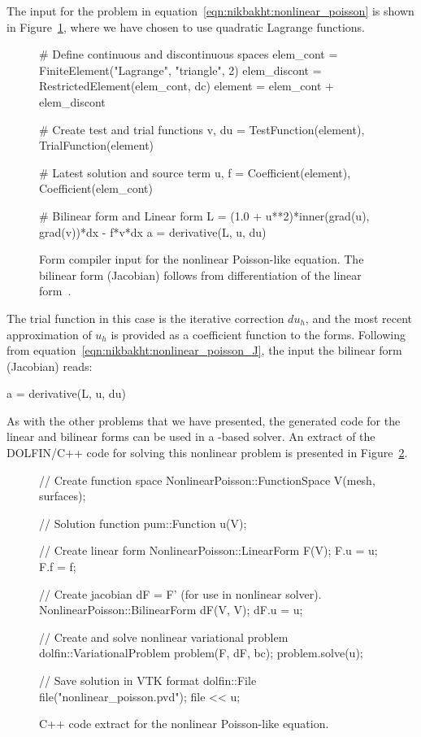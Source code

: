 The \ufl{} input for the problem in
equation~\eqref{eqn:nikbakht:nonlinear_poisson} is shown in
Figure~\ref{fig:nikbakht:ufl_nonlinear_poisson}, where we have chosen
to use quadratic Lagrange functions.
%
\begin{figure}
\begin{python}
# Define continuous and discontinuous spaces
elem_cont    = FiniteElement("Lagrange", "triangle", 2)
elem_discont = RestrictedElement(elem_cont, dc)
element      = elem_cont + elem_discont

# Create test and trial functions
v, du = TestFunction(element), TrialFunction(element)

# Latest solution and source term
u, f = Coefficient(element), Coefficient(elem_cont)

# Bilinear form and Linear form
L = (1.0 + u**2)*inner(grad(u), grad(v))*dx - f*v*dx
a = derivative(L, u, du)
\end{python}
\caption{Form compiler input for the nonlinear Poisson-like equation. The bilinear
form (Jacobian) follows from differentiation of the linear form~.}
\label{fig:nikbakht:ufl_nonlinear_poisson}
\end{figure}

The trial function in this case is the iterative correction $du_{h}$,
and the most recent approximation of $u_{h}$ is provided as a coefficient
function to the forms.  Following from equation~\eqref{eqn:nikbakht:nonlinear_poisson_J},
the \ufl{} input the bilinear form (Jacobian) reads:
%
\begin{python}
a = derivative(L, u, du)
\end{python}
%
As with the other problems that we have presented, the generated code for
the linear and bilinear forms can be used in a \dolfin{}-based solver.
An extract of the DOLFIN/C++ code for solving this nonlinear problem is
presented in Figure~\ref{fig:nikbakht:c++_nonlinear_poisson}.
%
\begin{figure}
\begin{c++}
// Create function space
NonlinearPoisson::FunctionSpace V(mesh, surfaces);

// Solution function
pum::Function u(V);

// Create linear form
NonlinearPoisson::LinearForm F(V);
F.u = u; F.f = f;

// Create jacobian dF = F' (for use in nonlinear solver).
NonlinearPoisson::BilinearForm dF(V, V);
dF.u = u;

// Create and solve nonlinear variational problem
dolfin::VariationalProblem problem(F, dF, bc);
problem.solve(u);

// Save solution in VTK format
dolfin::File file("nonlinear_poisson.pvd");
file << u;
\end{c++}
\caption{C++ code extract for the nonlinear Poisson-like equation.}
\label{fig:nikbakht:c++_nonlinear_poisson}
\end{figure}
